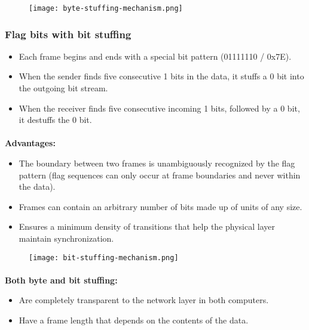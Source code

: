 \documentclass[../resumosRCOM.tex]{subfiles}
\begin{document}
\begin{figure}[h]
    \centering
    \texttt{[image: byte-stuffing-mechanism.png]}
\end{figure}

\subsubsection{Flag bits with bit stuffing}
\begin{itemize}
    \item Each frame begins and ends with a special bit pattern (01111110 / 0x7E).
    \item When the sender finds five consecutive 1 bits in the data, it stuffs a 0 bit
    into the outgoing bit stream.
    \item When the receiver finds five consecutive incoming 1 bits, followed by a 0
    bit, it destuffs the 0 bit.    
\end{itemize}

\paragraph{}
\textbf{Advantages:}
\begin{itemize}
    \item The boundary between two frames is unambiguously recognized by the
    flag pattern (flag sequences can only occur at frame boundaries and never
    within the data).
    \item Frames can contain an arbitrary number of bits made up of units of any
    size.
    \item Ensures a minimum density of transitions that help the physical layer
    maintain synchronization. 
\end{itemize}

\begin{figure}[H]
    \centering
    \texttt{[image: bit-stuffing-mechanism.png]}
\end{figure}

\paragraph{}
\textbf{Both byte and bit stuffing:}
\begin{itemize}
    \item Are completely transparent to the network layer in both computers.
    \item Have a frame length that depends on the contents of the data.
\end{itemize}
\end{document}
